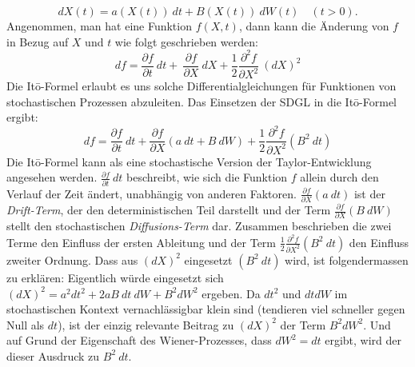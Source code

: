 
\begin{equation}
	dX(t) = a(X(t)) \ dt + B(X(t)) \ dW(t) \quad (t>0).
\end{equation}
Angenommen, man hat eine Funktion $ f(X,t) $, dann kann die Änderung von $ f $ in Bezug auf $ X $ und $ t $ wie folgt geschrieben werden:
\begin{equation}
	df = \frac{\partial f}{\partial t} \ dt + \ \frac{\partial f}{\partial X} \ dX + \frac{1}{2} \frac{\partial^2 f} {\partial X^2} \ (dX)^2	
\end{equation}
Die Itō-Formel erlaubt es uns solche Differentialgleichungen für Funktionen von stochastischen Prozessen abzuleiten. Das Einsetzen der SDGL in die Itō-Formel ergibt:
\begin{equation}
	df = \frac{\partial f}{\partial t} \ dt + \frac{\partial f}{\partial X} (a \ dt + B \ dW) + \frac{1}{2} \frac{\partial^2 f}{\partial X^2} (B^2 \ dt)
\end{equation}
Die Itō-Formel kann als eine stochastische Version der Taylor-Entwicklung angesehen werden. $ \frac{\partial f}{\partial t} \ dt $ beschreibt, wie sich die Funktion $ f $ allein durch den Verlauf der Zeit ändert, unabhängig von anderen Faktoren. $ \frac{\partial f}{\partial X} (a \ dt) $ ist der \textit{Drift-Term}, der den deterministischen Teil darstellt und der Term $  \frac{\partial f}{\partial X} (B \ dW) $ stellt den stochastischen \textit{Diffusions-Term} dar. Zusammen beschrieben die zwei Terme den Einfluss der ersten Ableitung und der Term $ \frac{1}{2} \frac{\partial^2 f}{\partial X^2} (B^2 \ dt) $ den Einfluss zweiter Ordnung. Dass aus $ (dX)^2 $ eingesetzt $ (B^2 \ dt) $ wird, ist folgendermassen zu erklären:
Eigentlich würde eingesetzt sich $ (dX)^2 = a^2 dt^2 + 2a B \ dt \ dW + B^2 dW^2 $ ergeben. Da $ dt^2 $ und $ dtdW $ im stochastischen Kontext vernachlässigbar klein sind (tendieren viel schneller gegen Null als $ dt $), ist der einzig relevante Beitrag zu $ (dX)^2 $ der Term $ B^2 dW^2 $. Und auf Grund der Eigenschaft des Wiener-Prozesses, dass $ dW^2 = dt $ ergibt, wird der dieser Ausdruck zu $ B^2 \ dt $.


